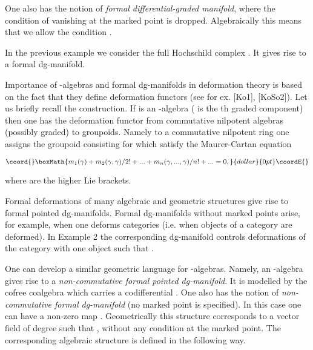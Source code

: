 \documentclass[a4paper,12pt]{article}
\begin{document}
One also has the notion of {\it formal differential-graded manifold},
where the condition of vanishing at the marked point is dropped.
Algebraically this means that we allow the condition \coordHE{}.

\begin{exa} In the previous example we consider the full
Hochschild complex \coordHE{}. It gives rise
to a formal dg-manifold.

\end{exa}

Importance of
\coordHE{}-algebras and formal dg-manifolds 
in deformation theory is based on the fact
that they define  deformation functors (see for ex. [Ko1], [KoSo2]).
Let us briefly recall the construction.
If \coordHE{} is an \coordHE{}-algebra (\coordHE{} is
the \coordHE{}th graded component) then
one has the deformation functor from commutative nilpotent algebras (possibly graded)  to groupoids.
Namely to a commutative nilpotent ring \coordHE{} one assigns the groupoid
\coordHE{} consisting for \coordHE{} which satisfy the
Maurer-Cartan equation

$$\coord{}\boxMath{m_1(\gamma)+m_2(\gamma,\gamma)/2!+...+m_n(\gamma,...,\gamma)/n!+...=0,}{dollar}{0pt}\coordE{}$$

where \coordHE{} are the higher Lie brackets.

Formal deformations of many algebraic and geometric structures
give rise to formal pointed dg-manifolds. Formal dg-manifolds without marked points
arise, for example, when one deforms categories (i.e. when  objects of a category are deformed).
In  Example 2 the corresponding dg-manifold controls deformations of the category
with one object \coordHE{} such that \coordHE{}.

One can develop a similar geometric language for \myHighlight{$\A$}\coordHE{}-algebras.
Namely, an \myHighlight{$\A$}\coordHE{}-algebra gives rise to a {\it non-commutative
formal pointed dg-manifold}. It is modelled by the cofree
coalgebra \coordHE{} which carries a codifferential \coordHE{}.
One also has the notion of
{\it non-commutative formal dg-manifold} (no marked point is specified).
In this case one can have a non-zero map \coordHE{}. Geometrically
this structure corresponds to a vector field \coordHE{} of degree \coordHE{}
such that 
\coordHE{}, without any condition at the marked point. 
The corresponding algebraic structure is defined in the following way.
\end{document}
